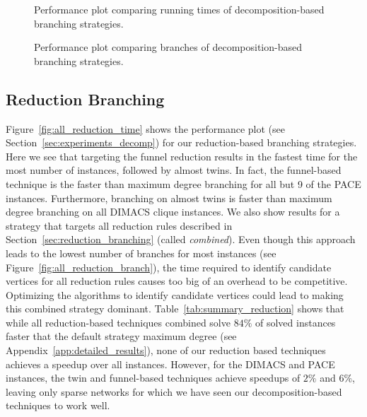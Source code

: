 \documentclass[a4paper,UKenglish,cleveref, autoref, thm-restate]{lipics-v2021}
\begin{document}
\begin{figure}[t]
	\centering
	
	\caption{Performance plot comparing running times of decomposition-based branching strategies.}\label{fig:all_decomp_time}
\end{figure}

\begin{figure}[t]
	\centering
	
	\caption{Performance plot comparing branches of decomposition-based branching strategies.}\label{fig:all_decomp_branch}
\end{figure}


\subsection{Reduction Branching}
Figure~\ref{fig:all_reduction_time} shows the performance plot (see
Section~\ref{sec:experiments_decomp}) for our reduction-based branching strategies. Here we see that targeting the funnel reduction
results in the fastest time for the most number of instances, followed by almost
twins. In fact, the
funnel-based technique is the faster than maximum degree branching for all but 9 of the PACE instances. Furthermore, branching on almost
twins is faster than maximum degree branching on all DIMACS clique instances. We also show results for a strategy that targets all reduction rules
described in Section~\ref{sec:reduction_branching} (called \emph{combined}). Even though this approach
leads to the lowest number of branches for most instances (see Figure~\ref{fig:all_reduction_branch}), the time required to
identify candidate vertices for all reduction rules causes too big of an
overhead to be competitive. Optimizing the algorithms to identify candidate
vertices could lead to making this combined strategy
dominant. Table~\ref{tab:summary_reduction} shows that while all reduction-based
techniques combined solve $84\%$ of solved instances faster that the default
strategy maximum degree (see Appendix~\ref{app:detailed_results}), none of our
reduction based techniques achieves a speedup over all instances. However, for
the DIMACS and PACE instances, the twin and funnel-based techniques achieve
speedups of $2\%$ and $6\%$, leaving only sparse networks for which we have seen
our decomposition-based techniques to work well.
\end{document}
